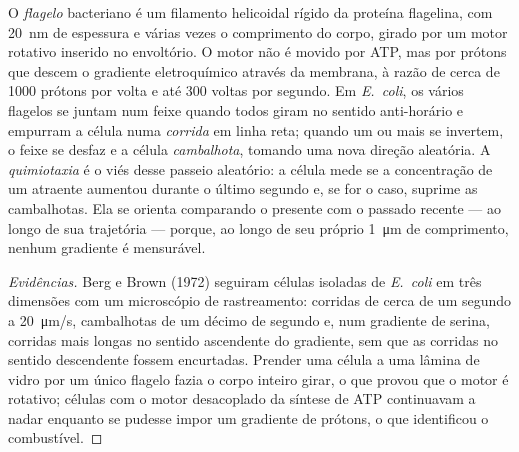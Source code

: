 \begin{proposition}\label{prop:b2:unicellular-diversity:flagellum}
O \emph{flagelo} bacteriano é um filamento helicoidal rígido da
proteína flagelina, com \qty{20}{nm} de espessura e várias vezes o
comprimento do corpo, girado por um motor rotativo inserido no
envoltório. O motor não é movido por ATP, mas por prótons que descem
o gradiente eletroquímico através da membrana, à razão de cerca de
\num{1000} prótons por volta e até \num{300} voltas por segundo. Em
\emph{E.~coli}, os vários flagelos se juntam num feixe quando todos
giram no sentido anti-horário e empurram a célula numa
\emph{corrida} em linha reta; quando um ou mais se invertem, o feixe se
desfaz e a célula \emph{cambalhota}, tomando uma nova direção
aleatória. A \emph{quimiotaxia} é o viés desse passeio aleatório: a
célula mede se a concentração de um atraente aumentou durante o
último segundo e, se for o caso, suprime as cambalhotas. Ela se
orienta comparando o presente com o passado recente --- ao longo de
sua trajetória --- porque, ao longo de seu próprio
\qty{1}{\micro m} de comprimento, nenhum gradiente é mensurável.
\end{proposition}
\begin{proof}[Evidências]
Berg e Brown (1972) seguiram células isoladas de \emph{E.~coli} em
três dimensões com um microscópio de rastreamento: corridas de cerca
de um segundo a \qty{20}{\micro m/s}, cambalhotas de um décimo de
segundo e, num gradiente de serina, corridas mais longas no sentido
ascendente do gradiente, sem que as corridas no sentido descendente
fossem encurtadas. Prender uma célula a uma lâmina de vidro por um
único flagelo fazia o corpo inteiro girar, o que provou que o motor é
rotativo; células com o motor desacoplado da síntese de ATP
continuavam a nadar enquanto se pudesse impor um gradiente de
prótons, o que identificou o combustível.
\end{proof}

